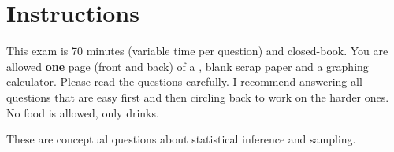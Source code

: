 \documentclass[12pt,landscape]{article}
\begin{document}
\section*{Instructions}
This exam is 70 minutes (variable time per question) and closed-book. You are allowed \textbf{one} page (front and back) of a , blank scrap paper and a graphing calculator. Please read the questions carefully. I recommend answering all questions that are easy first and then circling back to work on the harder ones. No food is allowed, only drinks. %

\pagebreak


\problem{} These are conceptual questions about statistical inference and sampling.

\vspace{-0.2cm}\benum{} 
\end{document}
